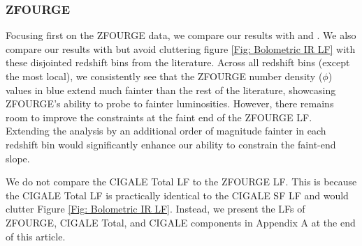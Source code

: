 \subsubsection{ZFOURGE} \label{Sec: ZF Total Discussion}
Focusing first on the ZFOURGE data, we compare our results with \cite{rodighiero_mid-_2010} and \cite{gruppioni_herschel_2013}. We also compare our results with \cite{huang_local_2007, caputi_infrared_2007, fu_decomposing_2010} but avoid cluttering figure \ref{Fig: Bolometric IR LF} with these disjointed redshift bins from the literature. Across all redshift bins (except the most local), we consistently see that the ZFOURGE number density ($\phi$) values in blue extend much fainter than the rest of the literature, showcasing ZFOURGE's ability to probe to fainter luminosities. However, there remains room to improve the constraints at the faint end of the ZFOURGE LF. Extending the analysis by an additional order of magnitude fainter in each redshift bin would significantly enhance our ability to constrain the faint-end slope.

We do not compare the CIGALE Total LF to the ZFOURGE LF. This is because the CIGALE Total LF is practically identical to the CIGALE SF LF and would clutter Figure \ref{Fig: Bolometric IR LF}. Instead, we present the LFs of ZFOURGE, CIGALE Total, and CIGALE components in Appendix A at the end of this article.

